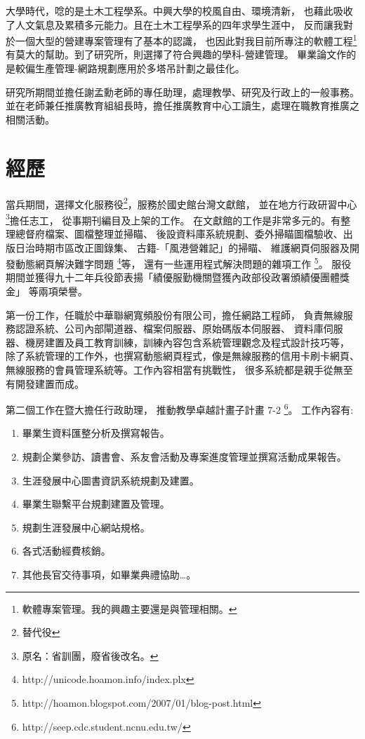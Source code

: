 \documentclass[12pt,a4paper]{article}
\begin{document}
\begin{CJK}{UTF8}{bsmi}
    大學時代，唸的是土木工程學系。中興大學的校風自由、環境清新，%
    也藉此吸收了人文氣息及累積多元能力。且在土木工程學系的四年求學生涯中，%
    反而讓我對於一個大型的營建專案管理有了基本的認識，%
    也因此對我目前所專注的軟體工程\footnote{軟體專案管理。我的興趣主要還是與管理相關。}%
    有莫大的幫助。到了研究所，則選擇了符合興趣的學科-營建管理。%
    畢業論文作的是較偏生產管理-網路規劃應用於多塔吊計劃之最佳化。

    研究所期間並擔任謝孟勳老師的專任助理，處理教學、研究及行政上的一般事務。%
    並在老師兼任推廣教育組組長時，擔任推廣教育中心工讀生，處理在職教育推廣之相關活動。
    \section{經歷}
    當兵期間，選擇文化服務役\footnote{替代役}，服務於國史館台灣文獻館，%
    並在地方行政研習中心\footnote{原名：省訓團，廢省後改名。}擔任志工，%
    從事期刊編目及上架的工作。%
    在文獻館的工作是非常多元的。有整理總督府檔案、圖檔整理並掃瞄、%
    後設資料庫系統規劃、委外掃瞄圖檔驗收、出版日治時期市區改正圖錄集、%
    古籍-「風港營雜記」的掃瞄、%
    維護網頁伺服器及開發動態網頁解決難字問題%
    \footnote{http://unicode.hoamon.info/index.plx}等，%
    還有一些運用程式解決問題的雜項工作%
    \footnote{http://hoamon.blogspot.com/2007/01/blog-post.html}。%
    服役期間並獲得九十二年兵役節表揚「績優服勤機關暨獲內政部役政署頒績優團體獎金」%
    等兩項榮譽。%

    第一份工作，任職於中華聯網寬頻股份有限公司，擔任網路工程師，%
    負責無線服務認證系統、公司內部閘道器、檔案伺服器、原始碼版本伺服器、%
    資料庫伺服器、機房建置及員工教育訓練，訓練內容包含系統管理觀念及程式設計技巧等，%
    除了系統管理的工作外，也撰寫動態網頁程式，像是無線服務的信用卡刷卡網頁、%
    無線服務的會員管理系統等。工作內容相當有挑戰性，%
    很多系統都是親手從無至有開發建置而成。%

    第二個工作在暨大擔任行政助理，%
    推動教學卓越計畫子計畫 7-2 \footnote{http://seep.cdc.student.ncnu.edu.tw/}。%
    工作內容有:

    \begin{enumerate}
        \item 畢業生資料匯整分析及撰寫報告。
        \item 規劃企業參訪、讀書會、系友會活動及專案進度管理並撰寫活動成果報告。
        \item 生涯發展中心圖書資訊系統規劃及建置。
        \item 畢業生聯繫平台規劃建置及管理。
        \item 規劃生涯發展中心網站規格。
        \item 各式活動經費核銷。
        \item 其他長官交待事項，如畢業典禮協助…。
    \end{enumerate}


\end{CJK}
\end{document}
